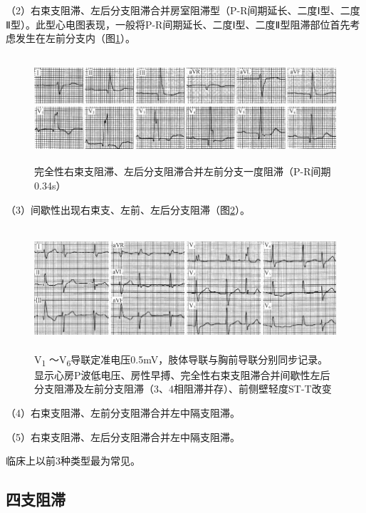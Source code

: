 （2）右束支阻滞、左后分支阻滞合并房室阻滞型（P-R间期延长、二度Ⅰ型、二度Ⅱ型）。此型心电图表现，一般将P-R间期延长、二度Ⅰ型、二度Ⅱ型阻滞部位首先考虑发生在左前分支内（图\ref{fig21-16}）。

\begin{figure}[!htbp]
 \centering
 \includegraphics[width=5.78125in,height=1.55208in]{./images/Image00364.jpg}
 \captionsetup{justification=centering}
 \caption{完全性右束支阻滞、左后分支阻滞合并左前分支一度阻滞（P-R间期0.34s）}
 \label{fig21-16}
  \end{figure} 

（3）间歇性出现右束支、左前、左后分支阻滞（图\ref{fig21-17}）。

\begin{figure}[!htbp]
 \centering
 \includegraphics[width=5.78125in,height=1.79167in]{./images/Image00365.jpg}
 \captionsetup{justification=centering}
 \caption{V\textsubscript{1} ～V\textsubscript{6}导联定准电压0.5mV，肢体导联与胸前导联分别同步记录。显示心房P波低电压、房性早搏、完全性右束支阻滞合并间歇性左后分支阻滞及左前分支阻滞（3、4相阻滞并存）、前侧壁轻度ST-T改变}
 \label{fig21-17}
  \end{figure} 


（4）右束支阻滞、左前分支阻滞合并左中隔支阻滞。

（5）右束支阻滞、左后分支阻滞合并左中隔支阻滞。

临床上以前3种类型最为常见。

\protect\hypertarget{text00028.htmlux5cux23subid354}{}{}

\subsection{四支阻滞}

